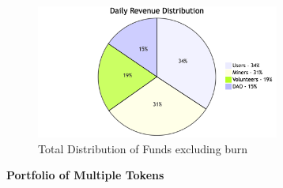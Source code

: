 \documentclass[letterpaper,11pt]{article}
\begin{document}
\begin{figure}[H]
\begin{center}
\includegraphics[width=8cm]{revenue-distribution}
\caption{Total Distribution of Funds excluding burn}
\end{center}
\end{figure}

\textbf{Portfolio of Multiple Tokens}\\
\end{document}
